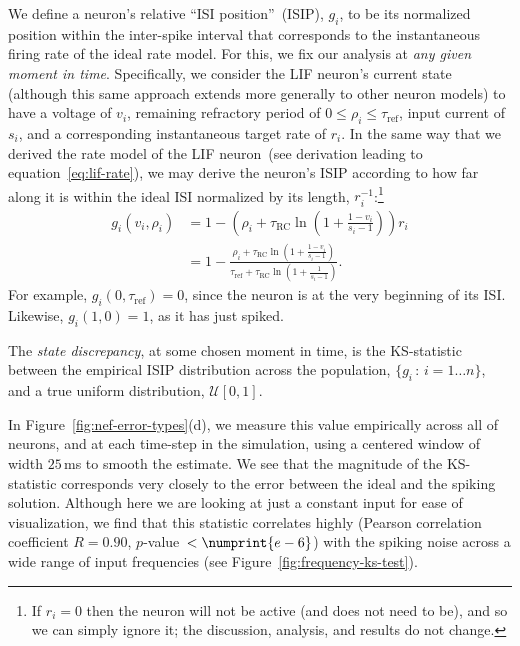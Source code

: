 We define a neuron's relative ``ISI position''~(ISIP), $g_i$, to be its normalized position within the inter-spike interval that corresponds to the instantaneous firing rate of the ideal rate model.
For this, we fix our analysis at \emph{any given moment in time}.
Specifically, we consider the LIF neuron's current state (although this same approach extends more generally to other neuron models) to have a voltage of $v_i$, remaining refractory period of $0 \le \rho_i \le \tau_\text{ref}$, input current of $s_i$, and a corresponding instantaneous target rate of $r_i$.
In the same way that we derived the rate model of the LIF neuron~(see derivation leading to equation~\ref{eq:lif-rate}), we may derive the neuron's ISIP according to how far along it is within the ideal ISI normalized by its length, $r_i^{-1}$:\footnote{%
If $r_i = 0$ then the neuron will not be active (and does not need to be), and so we can simply ignore it; the discussion, analysis, and results do not change.}
\begin{equation} \label{eq:lif-isip}
\begin{aligned}
g_i(v_i, \rho_i) &= 1 - \left( \rho_i + \tau_\text{RC} \ln \left( 1 + \frac{1 - v_i}{s_i - 1} \right) \right) r_i \\
&= 1 - \frac{\rho_i + \tau_\text{RC} \ln \left( 1 + \frac{1 - v_i}{s_i - 1} \right)}{\tau_\text{ref} + \tau_\text{RC} \ln \left( 1 + \frac{1}{s_i - 1} \right)} \text{.}
\end{aligned}
\end{equation}
For example, $g_i(0, \tau_\text{ref}) = 0$, since the neuron is at the very beginning of its ISI.
Likewise, $g_i(1, 0) = 1$, as it has just spiked.

\begin{definition} \label{def:state-discrepancy}
The \emph{state discrepancy}, at some chosen moment in time, is the KS-statistic between the empirical ISIP distribution across the population, $\{g_i \, : \, i = 1 \ldots n\}$, and a true uniform distribution, $\mathcal{U}[0, 1]$.
\end{definition}

In Figure~\ref{fig:nef-error-types}(d), we measure this value empirically across all of neurons, and at each time-step in the simulation, using a centered window of width $25$\,ms to smooth the estimate.
We see that the magnitude of the KS-statistic corresponds very closely to the error between the ideal and the spiking solution.
Although here we are looking at just a constant input for ease of visualization, we find that this statistic correlates highly (Pearson correlation coefficient $R = 0.90$, $p$-value~$< \numprint{e-6}$) with the spiking noise across a wide range of input frequencies (see Figure~\ref{fig:frequency-ks-test}).

